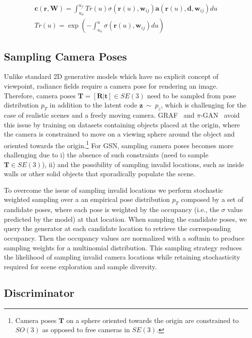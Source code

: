 \documentclass[10pt,twocolumn,letterpaper]{article}
\begin{document}
\begin{eqnarray}
\mathbf{c}(\mathbf{r}, \textbf{W}) = \int_{u_n}^{u_f} Tr(u) \sigma\left(\mathbf{r}(u), \textbf{w}_{ij}\right) \mathbf{a}\left(\mathbf{r}(u), \mathbf{d}, \textbf{w}_{ij}\right) du \nonumber  \\
Tr(u) = \exp \left(-\int_{u_n}^{u} \sigma(\textbf{r}(u), \textbf{w}_{ij}) du\right)
\label{eq:rendering}
\end{eqnarray}

\subsection{Sampling Camera Poses}\label{sec:camera_sampling}

Unlike standard 2D generative models which have no explicit concept of viewpoint, radiance fields require a camera pose for rendering an image. Therefore, camera poses $\textbf{T}=[\textbf{R} | \textbf{t}] \in SE(3)$ need to be sampled from pose distribution $p_T$ in addition to the latent code $\textbf{z}~\sim~p_z$, which is challenging for the case of realistic scenes and a freely moving camera. GRAF~\cite{graf} and $\pi$-GAN~\cite{pigan} avoid this issue by training on datasets containing objects placed at the origin, where the camera is constrained to move on a viewing sphere around the object and oriented towards the origin.\footnote{Camera poses $\textbf{T}$ on a sphere oriented towards the origin are constrained to $SO(3)$ as opposed to free cameras in $SE(3)$.} For GSN, sampling camera poses becomes more challenging due to i) the absence of such constraints (\ie need to sample $\textbf{T} \in SE(3)$), ii) and the possibility of sampling invalid locations, such as inside walls or other solid objects that sporadically populate the scene.

To overcome the issue of sampling invalid locations we perform stochastic weighted sampling over a an empirical pose distribution $p_T$ composed by a set of candidate poses, where each pose is weighted by the occupancy (i.e., the $\sigma$ value predicted by the model) at that location. When sampling the candidate poses, we query the generator at each candidate location to retrieve the corresponding occupancy. Then the occupancy values are normalized with a softmin to produce sampling weights for a multinomial distribution. This sampling strategy reduces the likelihood of sampling invalid camera locations while retaining stochasticity required for scene exploration and sample diversity.

\subsection{Discriminator}
\end{document}
